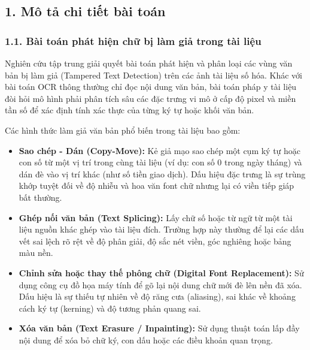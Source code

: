 \subsection{1. Mô tả chi tiết bài toán}
\subsubsection{1.1. Bài toán phát hiện chữ bị làm giả trong tài liệu}
\indent\indent Nghiên cứu tập trung giải quyết bài toán phát hiện và phân loại các vùng văn bản bị làm giả (Tampered Text Detection) trên các ảnh tài liệu số hóa. Khác với bài toán OCR thông thường chỉ đọc nội dung văn bản, bài toán pháp y tài liệu đòi hỏi mô hình phải phân tích sâu các đặc trưng vi mô ở cấp độ pixel và miền tần số để xác định tính xác thực của từng ký tự hoặc khối văn bản.\vspace{0.3cm}

Các hình thức làm giả văn bản phổ biến trong tài liệu bao gồm:\vspace{-0.1cm}
\begin{itemize}[label={--}, itemsep=1pt]
    \item \textbf{Sao chép - Dán (Copy-Move):} Kẻ giả mạo sao chép một cụm ký tự hoặc con số từ một vị trí trong cùng tài liệu (ví dụ: con số 0 trong ngày tháng) và dán đè vào vị trí khác (như số tiền giao dịch). Dấu hiệu đặc trưng là sự trùng khớp tuyệt đối về độ nhiễu và hoa văn font chữ nhưng lại có viền tiếp giáp bất thường.
    \item \textbf{Ghép nối văn bản (Text Splicing):} Lấy chữ số hoặc từ ngữ từ một tài liệu nguồn khác ghép vào tài liệu đích. Trường hợp này thường để lại các dấu vết sai lệch rõ rệt về độ phân giải, độ sắc nét viền, góc nghiêng hoặc bảng màu nền.
    \item \textbf{Chỉnh sửa hoặc thay thế phông chữ (Digital Font Replacement):} Sử dụng công cụ đồ họa máy tính để gõ lại nội dung chữ mới đè lên nền đã xóa. Dấu hiệu là sự thiếu tự nhiên về độ răng cưa (aliasing), sai khác về khoảng cách ký tự (kerning) và độ tương phản quang sai.
    \item \textbf{Xóa văn bản (Text Erasure / Inpainting):} Sử dụng thuật toán lấp đầy nội dung để xóa bỏ chữ ký, con dấu hoặc các điều khoản quan trọng.
\end{itemize}

